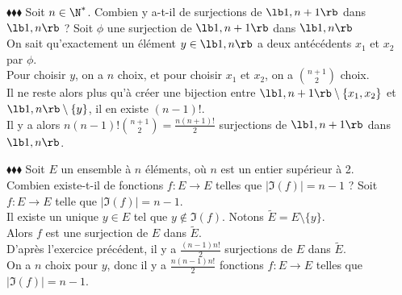 \documentclass[11pt]{article}
\begin{document}
\begin{exercice}{$\blacklozenge\blacklozenge\blacklozenge$}{}
    Soit $n\in\N^*$. Combien y a-t-il de surjections de $\lb1,n+1\rb$ dans $\lb1,n\rb$ ?
    \tcblower
    Soit $\phi$ une surjection de $\lb1,n+1\rb$ dans $\lb1,n\rb$\\
    On sait qu'exactement un élément $y\in\lb1,n\rb$ a deux antécédents $x_1$ et $x_2$ par $\phi$.\\
    Pour choisir $y$, on a $n$ choix, et pour choisir $x_1$ et $x_2$, on a $\binom{n+1}{2}$ choix.\\
    Il ne reste alors plus qu'à créer une bijection entre $\lb1,n+1\rb\setminus\{x_1,x_2\}$ et $\lb1,n\rb\setminus\{y\}$, il en existe $(n-1)!$.\\
    Il y a alors $n(n-1)!\binom{n+1}{2}=\frac{n(n+1)!}{2}$ surjections de $\lb1,n+1\rb$ dans $\lb1,n\rb$.
\end{exercice}

\begin{exercice}{$\blacklozenge\blacklozenge\blacklozenge$}{}
    Soit $E$ un ensemble à $n$ éléments, où $n$ est un entier supérieur à 2.\\
    Combien existe-t-il de fonctions $f:E\to E$ telles que $|\Im(f)|=n-1$ ?
    \tcblower
    Soit $f:E\to E$ telle que $|\Im(f)|=n-1$.\\
    Il existe un unique $y\in E$ tel que $y\notin\Im(f)$. Notons $\tilde{E}=E\setminus\{y\}$.\\
    Alors $f$ est une surjection de $E$ dans $\tilde{E}$.\\
    D'après l'exercice précédent, il y a $\frac{(n-1)n!}{2}$ surjections de $E$ dans $\tilde{E}$.\\
    On a $n$ choix pour $y$, donc il y a $\frac{n(n-1)n!}{2}$ fonctions $f:E\to E$ telles que $|\Im(f)|=n-1$.
\end{exercice}
\end{document}
